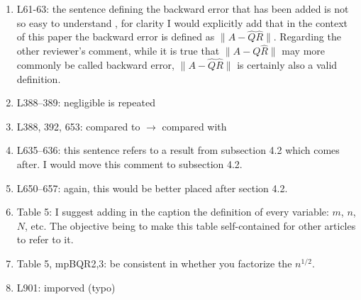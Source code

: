 \documentclass[final,onefignum,onetabnum]{siamart190516}
\begin{document}
\begin{enumerate}
	\item L61-63: the sentence defining the backward error that has been added is not so easy to understand , for clarity I would explicitly add that in the context of this paper the backward error is defined as $\|A- \hat{Q}\hat{R}\|$. Regarding the other reviewer’s comment, while it is true that $\|A-Q\hat{R}\|$  may more commonly be called backward error, $\|A-\hat{Q}\hat{R}\|$ is certainly also a valid definition.
	\item L388–389: negligible is repeated
	\item L388, 392, 653: compared to $\rightarrow$ compared with
	\item L635–636: this sentence refers to a result from subsection 4.2 which comes after. I would move this comment to subsection 4.2.
	\item L650–657: again, this would be better placed after section 4.2.
	\item Table 5: I suggest adding in the caption the definition of every variable: $m$, $n$, $N$, etc. The objective being to make this table self-contained for other articles to refer to it.
	\item Table 5, mpBQR2,3: be consistent in whether you factorize the $n^{1/2}$.
	\item L901: imporved (typo)
\end{enumerate}



%
\end{document}

